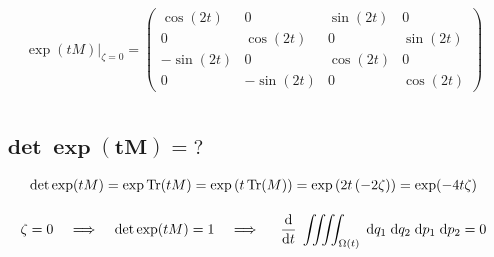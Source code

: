 \documentclass[10pt,a4paper]{article}
\newcommand{\const}[1]{\text{\rmfamily\upshape #1}}
\newcommand{\mat}[1]{
    \begin{pmatrix}
        #1
    \end{pmatrix}
}
\renewcommand{\d}[1]{\;\const{d}#1}
\newcommand{\dd}[2]{\frac{\const{d} #1}{\const{d} #2} \;}
\newcommand{\Tr}{\operatorname{Tr}}
\begin{document}
\begin{gather*}
    \\[25pt]
    \exp(tM) |_{\zeta=0} = \mat{\cos{\left(2 t \right)} & 0 & \sin{\left(2 t \right)} & 0\\0 & \cos{\left(2 t \right)} & 0 & \sin{\left(2 t \right)}\\- \sin{\left(2 t \right)} & 0 & \cos{\left(2 t \right)} & 0\\0 & - \sin{\left(2 t \right)} & 0 & \cos{\left(2 t \right)}}
    \\[25pt]
\end{gather*}

\subsection{
    \texorpdfstring{
        $\pmb{ \det\exp(tM) = \mathit{?} }$
    }{
        det exp(tM) = ?
    }
}
\begin{gather*}
    \det \exp(tM) = \exp \Tr(tM) =
    \exp\left( t \Tr(M) \right) =
    \exp\left( 2t \left(-2\zeta\right) \right) =
    \exp(-4t\zeta)
    \\[10pt]
    \zeta = 0
    \;\;\;
    \implies
    \;\;\;
    \det\exp(tM) = 1
    \;\;\;
    \implies
    \;\;\;\
    \dd{}{t}
    \iiiint_{\Omega(t)}
    \d{q_1} \d{q_2} \d{p_1} \d{p_2} = 0
\end{gather*}
\end{document}
